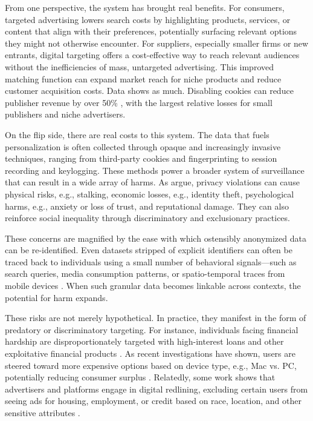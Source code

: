 \documentclass[12pt, letterpaper]{article}
\begin{document}
From one perspective, the system has brought real benefits. For consumers, targeted advertising lowers search costs by highlighting products, services, or content that align with their preferences, potentially surfacing relevant options they might not otherwise encounter. For suppliers, especially smaller firms or new entrants, digital targeting offers a cost-effective way to reach relevant audiences without the inefficiencies of mass, untargeted advertising. This improved matching function can expand market reach for niche products and reduce customer acquisition costs. Data shows as much. Disabling cookies can reduce publisher revenue by over 50\% \citep{johnson2020consumer, ravichandran2019effect}, with the largest relative losses for small publishers and niche advertisers.

On the flip side, there are real costs to this system. The data that fuels personalization is often collected through opaque and increasingly invasive techniques, ranging from third-party cookies and fingerprinting to session recording and keylogging. These methods power a broader system of surveillance that can result in a wide array of harms. As \cite{citron2022privacy} argue, privacy violations can cause physical risks, e.g., stalking, economic losses, e.g., identity theft, psychological harms, e.g., anxiety or loss of trust, and reputational damage. They can also reinforce social inequality through discriminatory and exclusionary practices.

These concerns are magnified by the ease with which ostensibly anonymized data can be re-identified. Even datasets stripped of explicit identifiers can often be traced back to individuals using a small number of behavioral signals—such as search queries, media consumption patterns, or spatio-temporal traces from mobile devices \citep{achara2015unicity}. When such granular data becomes linkable across contexts, the potential for harm expands.

These risks are not merely hypothetical. In practice, they manifest in the form of predatory or discriminatory targeting. For instance, individuals facing financial hardship are disproportionately targeted with high-interest loans and other exploitative financial products \citep{christl2016networks}. As recent investigations have shown, users are steered toward more expensive options based on device type, e.g., Mac vs. PC, potentially reducing consumer surplus \citep{borgesius2020price, bujlow2015web, hannak2014measuring}. Relatedly, some work shows that advertisers and platforms engage in digital redlining, excluding certain users from seeing ads for housing, employment, or credit based on race, location, and other sensitive attributes \citep{angwin2016facebook}. 
\end{document}
